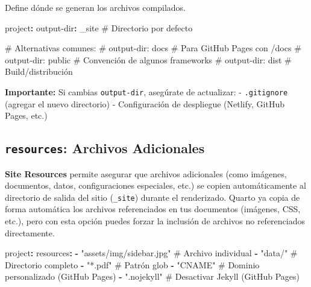 \documentclass[
  doc,
  floatsintext,
  longtable,
  a4paper,
  nolmodern,
  notxfonts,
  notimes,
  12pt,
  colorlinks=true,linkcolor=blue,citecolor=blue,urlcolor=blue]{apa7}
\newenvironment{Shaded}{\begin{snugshade}}{\end{snugshade}}
\newcommand{\AttributeTok}[1]{\textcolor[rgb]{0.40,0.45,0.13}{#1}}
\newcommand{\CommentTok}[1]{\textcolor[rgb]{0.37,0.37,0.37}{#1}}
\newcommand{\FunctionTok}[1]{\textcolor[rgb]{0.28,0.35,0.67}{#1}}
\newcommand{\KeywordTok}[1]{\textcolor[rgb]{0.00,0.23,0.31}{\textbf{#1}}}
\newcommand{\StringTok}[1]{\textcolor[rgb]{0.13,0.47,0.30}{#1}}
\begin{document}
Define dónde se generan los archivos compilados.

\begin{Shaded}
\begin{Highlighting}[]
\FunctionTok{project}\KeywordTok{:}
\AttributeTok{  }\FunctionTok{output{-}dir}\KeywordTok{:}\AttributeTok{ \_site}\CommentTok{          \# Directorio por defecto}

\CommentTok{\# Alternativas comunes:}
\CommentTok{\# output{-}dir: docs           \# Para GitHub Pages con /docs}
\CommentTok{\# output{-}dir: public         \# Convención de algunos frameworks}
\CommentTok{\# output{-}dir: dist           \# Build/distribución}
\end{Highlighting}
\end{Shaded}

\textbf{Importante:} Si cambias \texttt{output-dir}, asegúrate de
actualizar: - \texttt{.gitignore} (agregar el nuevo directorio) -
Configuración de despliegue (Netlify, GitHub Pages, etc.)

\subsection{\texorpdfstring{\texttt{resources}: Archivos
Adicionales}{resources: Archivos Adicionales}}\label{resources-archivos-adicionales}

\textbf{Site Resources} permite asegurar que archivos adicionales (como
imágenes, documentos, datos, configuraciones especiales, etc.) se copien
automáticamente al directorio de salida del sitio (\texttt{\_site})
durante el renderizado. Quarto ya copia de forma automática los archivos
referenciados en tus documentos (imágenes, CSS, etc.), pero con esta
opción puedes forzar la inclusión de archivos no referenciados
directamente.

\begin{Shaded}
\begin{Highlighting}[]
\FunctionTok{project}\KeywordTok{:}
\AttributeTok{  }\FunctionTok{resources}\KeywordTok{:}
\AttributeTok{    }\KeywordTok{{-}}\AttributeTok{ }\StringTok{"assets/img/sidebar.jpg"}\CommentTok{      \# Archivo individual}
\AttributeTok{    }\KeywordTok{{-}}\AttributeTok{ }\StringTok{"data/"}\CommentTok{                       \# Directorio completo}
\AttributeTok{    }\KeywordTok{{-}}\AttributeTok{ }\StringTok{"*.pdf"}\CommentTok{                       \# Patrón glob}
\AttributeTok{    }\KeywordTok{{-}}\AttributeTok{ }\StringTok{"CNAME"}\CommentTok{                       \# Dominio personalizado (GitHub Pages)}
\AttributeTok{    }\KeywordTok{{-}}\AttributeTok{ }\StringTok{".nojekyll"}\CommentTok{                   \# Desactivar Jekyll (GitHub Pages)}
\end{Highlighting}
\end{Shaded}
\end{document}
